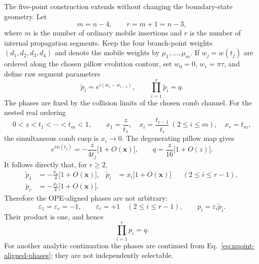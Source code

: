 \documentclass[11pt]{article}
\begin{document}
The five-point construction extends without changing the boundary-state
geometry.  Let
\begin{equation}
 m=n-4,\qquad r=m+1=n-3,
 \label{eq:npoint-counts}
\end{equation}
where $m$ is the number of ordinary mobile insertions and $r$ is the number
of internal propagation segments.  Keep the four branch-point weights
$(d_1,d_2,d_3,d_4)$ and denote the mobile weights by
$\mu_1,\ldots,\mu_m$.  If $w_j=w(t_j)$ are ordered along the chosen pillow
evolution contour, set $w_0=0$, $w_r=\pi\tau$, and define raw segment
parameters
\begin{equation}
 \widetilde p_i=e^{i(w_i-w_{i-1})},\qquad
 \prod_{i=1}^{r}\widetilde p_i=q.
 \label{eq:npoint-raw-segments}
\end{equation}
The phases are fixed by the collision limits of the chosen comb channel.
For the nested real ordering
\begin{equation}
 0<z<t_1<\cdots<t_m<1,
 \qquad
 x_1=\frac{z}{t_1},\quad
 x_i=\frac{t_{i-1}}{t_i}\ (2\leq i\leq m),\quad
 x_r=t_m,
 \label{eq:npoint-plane-ope-variables}
\end{equation}
the simultaneous comb cusp is $x_i\to0$.  The degenerating pillow map gives
\begin{equation}
 e^{iw(t_j)}=-\frac{z}{4t_j}\bigl[1+O(\boldsymbol x)\bigr],
 \qquad q=\frac{z}{16}\bigl[1+O(z)\bigr].
 \label{eq:npoint-pillow-collision-asymptotic}
\end{equation}
It follows directly that, for $r\geq2$,
\begin{align}
 \widetilde p_1
 &=-\frac{x_1}{4}\bigl[1+O(\boldsymbol x)\bigr],
 &
 \widetilde p_i
 &=x_i\bigl[1+O(\boldsymbol x)\bigr]
 &&(2\leq i\leq r-1),
 \nonumber\\
 \widetilde p_r
 &=-\frac{x_r}{4}\bigl[1+O(\boldsymbol x)\bigr].
 \label{eq:npoint-raw-collision-asymptotic}
\end{align}
Therefore the OPE-aligned phases are not arbitrary:
\begin{equation}
 \boxed{
 \varepsilon_1=\varepsilon_r=-1,
 \qquad \varepsilon_i=+1\quad(2\leq i\leq r-1),
 \qquad p_i=\varepsilon_i\widetilde p_i.}
 \label{eq:npoint-aligned-phases}
\end{equation}
Their product is one, and hence
\begin{equation}
 \boxed{\prod_{i=1}^{r}p_i=q.}
 \label{eq:npoint-product-nome}
\end{equation}
For another analytic continuation the phases are continued from
Eq.~\eqref{eq:npoint-aligned-phases}; they are not independently selectable.
\end{document}
